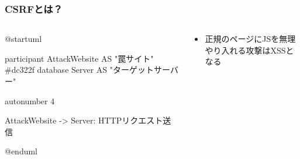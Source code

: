 \begin{frame}[fragile]
  \frametitle{CSRFとは？}

  \begin{columns}
    \begin{column}{.4\textwidth}
      \begin{minipage}{\textwidth}
        \begin{plantuml}
          @startuml
          
          participant AttackWebsite AS "罠サイト" #dc322f
          database Server AS "ターゲットサーバー"
       
          autonumber 4
          
          AttackWebsite -> Server: HTTPリクエスト送信
       
          @enduml
        \end{plantuml}
      \end{minipage}
    \end{column}
    \begin{column}{.6\textwidth}

      \pause

      \begin{itemize}
        \item 正規のページにJSを無理やり入れる攻撃はXSSとなる
      \end{itemize}
    \end{column}
  \end{columns}
\end{frame}

